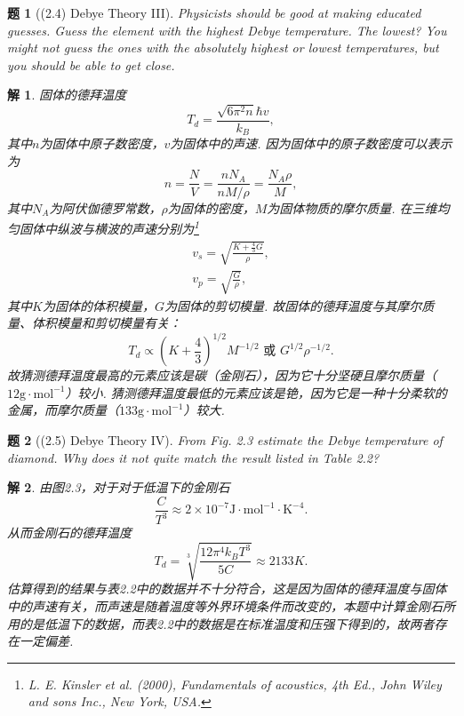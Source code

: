 \documentclass[UTF8,10pt,a4paper]{article}
\theoremstyle{Problem}
\newtheorem{prob}{题}
\theoremstyle{Solution}
\newtheorem*{sol}{解}
\begin{document}
\begin{prob}[(2.4) Debye Theory III]
    Physicists should be good at making educated guesses. Guess the element with the highest Debye temperature. The lowest? You might not guess the ones with the absolutely highest or lowest temperatures, but you should be able to get close.
\end{prob}
\begin{sol}
    固体的德拜温度
    \begin{equation}
        T_d=\frac{\sqrt{6\pi^2n}\hbar v}{k_B},
    \end{equation}
    其中$n$为固体中原子数密度，$v$为固体中的声速.
    因为固体中的原子数密度可以表示为
    \begin{equation}
        n=\frac{N}{V}=\frac{nN_A}{nM/\rho}=\frac{N_A\rho}{M},
    \end{equation}
    其中$N_A$为阿伏伽德罗常数，$\rho$为固体的密度，$M$为固体物质的摩尔质量.
    在三维均匀固体中纵波与横波的声速分别为\footnote{L. E. Kinsler et al. (2000), Fundamentals of acoustics, 4th Ed., John Wiley and sons Inc., New York, USA.}
    \begin{gather}
        v_s=\sqrt{\frac{K+\frac{4}{3}G}{\rho}},\\
        v_p=\sqrt{\frac{G}{\rho}},
    \end{gather}
    其中$K$为固体的体积模量，$G$为固体的剪切模量.
    故固体的德拜温度与其摩尔质量、体积模量和剪切模量有关：
    \begin{equation}
        T_d\propto \left(K+\frac{4}{3}\right)^{1/2}M^{-1/2}\text{ 或 }G^{1/2}\rho^{-1/2}.
    \end{equation}
    故猜测德拜温度最高的元素应该是碳（金刚石），因为它十分坚硬且摩尔质量（$12\text{g}\cdot\text{mol}^{-1}$）较小.
    猜测德拜温度最低的元素应该是铯，因为它是一种十分柔软的金属，而摩尔质量（$133\text{g}\cdot\text{mol}^{-1}$）较大.
\end{sol}

\begin{prob}[(2.5) Debye Theory IV]
    From Fig. 2.3 estimate the Debye temperature of diamond. Why does it not quite match the result listed in Table 2.2?
\end{prob}
\begin{sol}
    由图2.3，对于对于低温下的金刚石
    \begin{equation}
        \frac{C}{T^3}\approx 2\times 10^{-7}\text{J}\cdot\text{mol}^{-1}\cdot\text{K}^{-4}.
    \end{equation}
    从而金刚石的德拜温度
    \begin{equation}
        T_d=\sqrt[3]{\frac{12\pi^4k_BT^3}{5C}}\approx 2133K.
    \end{equation}
    估算得到的结果与表2.2中的数据并不十分符合，这是因为固体的德拜温度与固体中的声速有关，而声速是随着温度等外界环境条件而改变的，本题中计算金刚石所用的是低温下的数据，而表2.2中的数据是在标准温度和压强下得到的，故两者存在一定偏差.
\end{sol}
\end{document}
